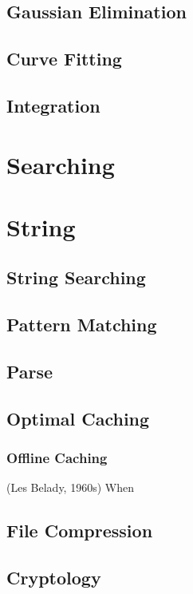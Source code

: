 		\section{Gaussian Elimination}

		\section{Curve Fitting}

		\section{Integration}

	\chapter{Searching}

	\chapter{String}
		\section{String Searching}

		\section{Pattern Matching}

		\section{Parse}

		\section{Optimal Caching}			
			\subsection{Offline Caching}
				\begin{definition}
					(Les Belady, 1960s) When 
				\end{definition}

		\section{File Compression}

		\section{Cryptology}

